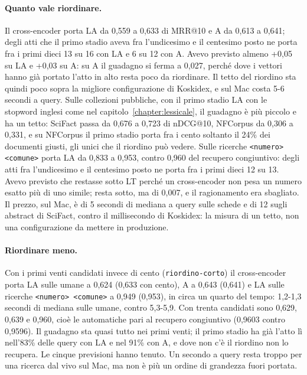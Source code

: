 \paragraph{Quanto vale riordinare.} Il cross-encoder porta LA da 0,559 a
0,633 di MRR@10 e A da 0,613 a 0,641; degli atti che il primo stadio aveva fra
l'undicesimo e il centesimo posto ne porta fra i primi dieci 13 su 16 con LA e
6 su 12 con A. Avevo previsto almeno +0,05 su LA e +0,03 su A: su A il
guadagno si ferma a 0,027, perché dove i vettori hanno già portato l'atto in
alto resta poco da riordinare. Il tetto del riordino sta quindi poco sopra la
migliore configurazione di Koskidex, e sul Mac costa 5-6 secondi a query.
Sulle collezioni pubbliche, con il primo stadio LA con le stopword inglesi
come nel capitolo~\ref{chapter:lessicale}, il guadagno è più piccolo e ha un
tetto: SciFact passa da 0,676 a 0,723 di nDCG@10, NFCorpus da 0,306 a 0,331, e su NFCorpus
il primo stadio porta fra i cento soltanto il 24\% dei documenti giusti, gli
unici che il riordino può vedere. Sulle ricerche \texttt{<numero> <comune>}
porta LA da 0,833 a 0,953, contro 0,960 del recupero congiuntivo: degli atti
fra l'undicesimo e il centesimo posto ne porta fra i primi dieci 12 su 13.
Avevo previsto che restasse sotto LT perché un cross-encoder non pesa un
numero esatto più di uno simile; resta sotto, ma di 0,007, e il ragionamento
era sbagliato. Il prezzo, sul Mac, è di 5 secondi di mediana a query sulle schede e di
12 sugli abstract di SciFact, contro il millisecondo di Koskidex: la misura di
un tetto, non una configurazione da mettere in produzione.

\paragraph{Riordinare meno.} Con i primi venti candidati invece di cento
(\texttt{riordino-corto}) il cross-encoder porta LA sulle umane a
0,624 (0,633 con cento), A a 0,643 (0,641) e LA sulle ricerche
\texttt{<numero> <comune>} a 0,949 (0,953), in circa un quarto del tempo: 1,2-1,3
secondi di mediana sulle umane, contro 5,3-5,9. Con trenta candidati sono 0,629,
0,639 e 0,960, cioè le automatiche pari al recupero congiuntivo (0,9603 contro 0,9596).
Il guadagno sta quasi tutto nei primi venti; il primo stadio ha già l'atto lì
nell'83\% delle query con LA e nel 91\% con A, e dove non c'è il riordino non lo
recupera. Le cinque previsioni hanno tenuto. Un
secondo a query resta troppo per una ricerca dal vivo sul Mac, ma non è più un
ordine di grandezza fuori portata.

